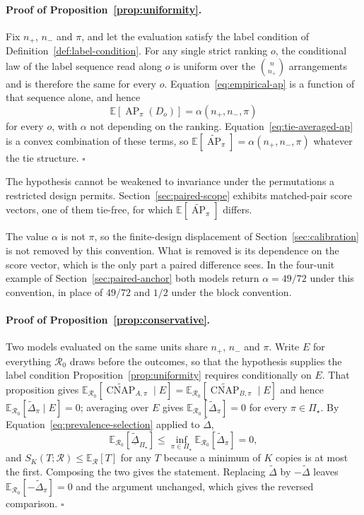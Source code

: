 \documentclass[11pt]{article}
\newcommand{\AP}{\operatorname{AP}}
\newcommand{\CNAP}{\operatorname{CNAP}}
\newcommand{\Regime}{\mathcal{R}}
\newcommand{\PSet}{\Pi_\star}
\newcommand{\E}{\mathbb{E}}
\newcommand{\APta}{\widetilde{\AP}}
\newcommand{\CNAPta}{\widetilde{\CNAP}}
\newcommand{\Dta}{\widetilde{\Delta}}
\newcommand{\RobDta}{\underline{\widetilde{\Delta}}_{\PSet}}
\theoremstyle{remark}
\begin{document}
\paragraph{Proof of Proposition~\ref{prop:uniformity}.}
Fix $n_+$, $n_-$ and $\pi$, and let the evaluation satisfy the label condition of Definition~\ref{def:label-condition}. For any single strict ranking $o$, the conditional law of the label sequence read along $o$ is uniform over the $\binom{n}{n_+}$ arrangements and is therefore the same for every $o$. Equation~\eqref{eq:empirical-ap} is a function of that sequence alone, and hence
\[
\E\left[\AP_\pi(D_o)\right]
=
\alpha(n_+,n_-,\pi)
\]
for every $o$, with $\alpha$ not depending on the ranking. Equation~\eqref{eq:tie-averaged-ap} is a convex combination of these terms, so $\E[\APta_\pi]=\alpha(n_+,n_-,\pi)$ whatever the tie structure. $\square$

The hypothesis cannot be weakened to invariance under the permutations a restricted design permits. Section~\ref{sec:paired-scope} exhibits matched-pair score vectors, one of them tie-free, for which $\E[\APta_\pi]$ differs.

The value $\alpha$ is not $\pi$, so the finite-design displacement of Section~\ref{sec:calibration} is not removed by this convention. What is removed is its dependence on the score vector, which is the only part a paired difference sees. In the four-unit example of Section~\ref{sec:paired-anchor} both models return $\alpha=49/72$ under this convention, in place of $49/72$ and $1/2$ under the block convention.

\paragraph{Proof of Proposition~\ref{prop:conservative}.}
Two models evaluated on the same units share $n_+$, $n_-$ and $\pi$. Write $E$ for everything $\Regime_0$ draws before the outcomes, so that the hypothesis supplies the label condition Proposition~\ref{prop:uniformity} requires conditionally on $E$. That proposition gives $\E_{\Regime_0}[\CNAPta_{A,\pi}\mid E]=\E_{\Regime_0}[\CNAPta_{B,\pi}\mid E]$ and hence $\E_{\Regime_0}[\Dta_\pi\mid E]=0$; averaging over $E$ gives $\E_{\Regime_0}[\Dta_\pi]=0$ for every $\pi\in\PSet$. By Equation~\eqref{eq:prevalence-selection} applied to $\Dta$,
\[
\E_{\Regime_0}[\RobDta]
\leq
\inf_{\pi\in\PSet}\E_{\Regime_0}[\Dta_\pi]
=0 ,
\]
and $S_K(T;\Regime)\leq\E_{\Regime}[T]$ for any $T$ because a minimum of $K$ copies is at most the first. Composing the two gives the statement. Replacing $\Dta$ by $-\Dta$ leaves $\E_{\Regime_0}[-\Dta_\pi]=0$ and the argument unchanged, which gives the reversed comparison. $\square$
\end{document}
